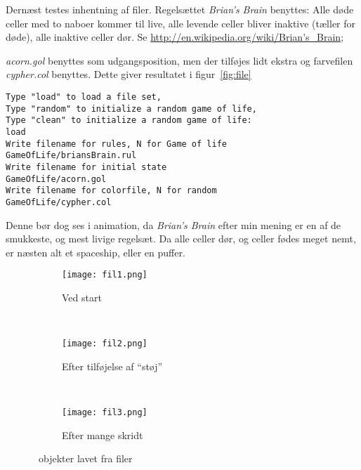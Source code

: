 Dernæst testes inhentning af filer. Regelsættet \emph{Brian's Brain} benyttes: Alle døde celler med to naboer kommer til live, alle levende celler bliver inaktive (tæller for døde), alle inaktive celler dør. Se \url{http://en.wikipedia.org/wiki/Brian's_Brain};

\emph{acorn.gol} benyttes som udgangsposition, men der tilføjes lidt ekstra og farvefilen \emph{cypher.col} benyttes. Dette giver resultatet i figur~\ref{fig:file}
\begin{lstlisting}[caption=" Tilf\ae ldigt game of life p\aa 50x50"]
Type "load" to load a file set,
Type "random" to initialize a random game of life,
Type "clean" to initialize a random game of life:
load
Write filename for rules, N for Game of life
GameOfLife/briansBrain.rul
Write filename for initial state
GameOfLife/acorn.gol
Write filename for colorfile, N for random
GameOfLife/cypher.col
\end{lstlisting}
Denne bør dog ses i animation, da \emph{Brian's Brain} efter min mening er en af de smukkeste, og mest livige regelsæt.
Da alle celler dør, og celler fødes meget nemt, er næsten alt et spaceship, eller en puffer.

\begin{figure}
        \centering
        \begin{subfigure}[b]{0.3\textwidth}
                \centering
                \texttt{[image: fil1.png]}
                \caption{Ved start}
        \end{subfigure}%
        ~
        \begin{subfigure}[b]{0.3\textwidth}
                \centering
                \texttt{[image: fil2.png]}
                \caption{Efter tilføjelse af ``støj''}
        \end{subfigure}
        ~
        \begin{subfigure}[b]{0.3\textwidth}
                \centering
                \texttt{[image: fil3.png]}
                \caption{Efter mange skridt}
        \end{subfigure}
        \caption{\gol~objekter lavet fra filer}\label{fig:fil}
\end{figure}